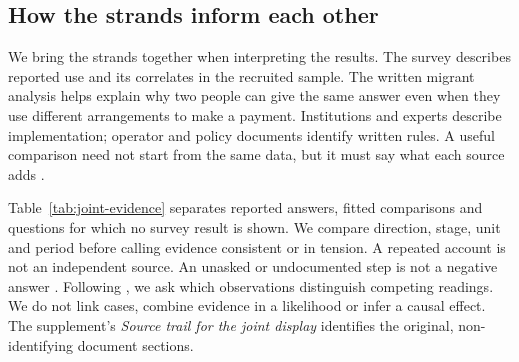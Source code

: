 \subsection{How the strands inform each other}
\label{sec:integration}
We bring the strands together when interpreting the results. The survey describes reported use and its correlates in the recruited sample. The written migrant analysis helps explain why two people can give the same answer even when they use different arrangements to make a payment. Institutions and experts describe implementation; operator and policy documents identify written rules. A useful comparison need not start from the same data, but it must say what each source adds \citep{greeneCaracelliGraham1989,fettersCurryCreswell2013,guettermanFettersCreswell2015}.

Table~\ref{tab:joint-evidence} separates reported answers, fitted comparisons and questions for which no survey result is shown. We compare direction, stage, unit and period before calling evidence consistent or in tension. A repeated account is not an independent source. An unasked or undocumented step is not a negative answer \citep{ocathainMurphyNicholl2010}. Following \citet{humphreysJacobs2023}, we ask which observations distinguish competing readings. We do not link cases, combine evidence in a likelihood or infer a causal effect. The supplement's \emph{Source trail for the joint display} identifies the original, non-identifying document sections.

